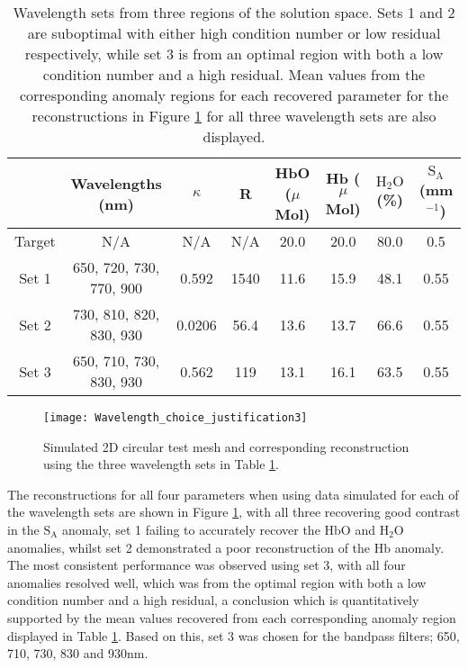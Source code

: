 \documentclass[twoside]{bhamthesis}
\theoremstyle{definition}
\begin{document}
\bgroup
\def\arraystretch{1.2}
\begin{table}[!ht]
\footnotesize
\begin{center}
 \begin{tabular}{c c c c c c c c} 
 \hline
& Wavelengths (nm) & $\kappa$ & R & HbO ($\mu$Mol) & Hb ($\mu$Mol) & $\mathrm{H_2O}$ (\%) & $\mathrm{S_A}$ (mm$^{-1}$) \\ [0.6ex] 
 \hline
Target & N/A & N/A & N/A & 20.0 & 20.0 & 80.0 & 0.5 \\
Set 1 & 650, 720, 730, 770, 900 & 0.592 & 1540 & 11.6 & 15.9 & 48.1 & 0.55 \\ 
Set 2 & 730, 810, 820, 830, 930  & 0.0206 &  56.4 &  13.6 & 13.7 & 66.6 & 0.55  \\
Set 3 & 650, 710, 730, 830, 930 & 0.562 &  119 & 13.1 & 16.1 & 63.5 & 0.55 \\
\hline				
\end{tabular}
\caption{Wavelength sets from three regions of the solution space. Sets 1 and 2 are suboptimal with either high condition number or low residual respectively, while set 3 is from an optimal region with both a low condition number and a high residual. Mean values from the corresponding anomaly regions for each recovered parameter for the reconstructions in Figure 
\ref{justification_wavelength} for all three wavelength sets are also displayed.}
\label{tab:Wavelngth_sets}
\end{center}
\end{table}
\egroup
    
\begin{figure}[!ht]
\centering
  \texttt{[image: Wavelength\_choice\_justification3]}
\caption{Simulated 2D circular test mesh and corresponding reconstruction using the three wavelength sets in Table \ref{tab:Wavelngth_sets}.}
\label{justification_wavelength}
\end{figure}
 
The reconstructions for all four parameters when using data simulated for each of the wavelength sets are shown in Figure 
\ref{justification_wavelength}, with all three recovering good contrast in the $\mathrm{S_A}$ anomaly, set 1 failing to accurately recover the $\mathrm{HbO}$ and $\mathrm{H_2O}$ anomalies, whilst set 2 demonstrated a poor reconstruction of the $\mathrm{Hb}$ anomaly. The most consistent performance was observed using set 3, with all four anomalies resolved well, which was from the optimal region with both a low condition number and a high residual, a conclusion which is quantitatively supported by the mean values recovered from each corresponding anomaly region displayed in Table \ref{tab:Wavelngth_sets}. Based on this, set 3 was chosen for the
bandpass filters; 650, 710, 730, 830 and 930nm.
\end{document}
